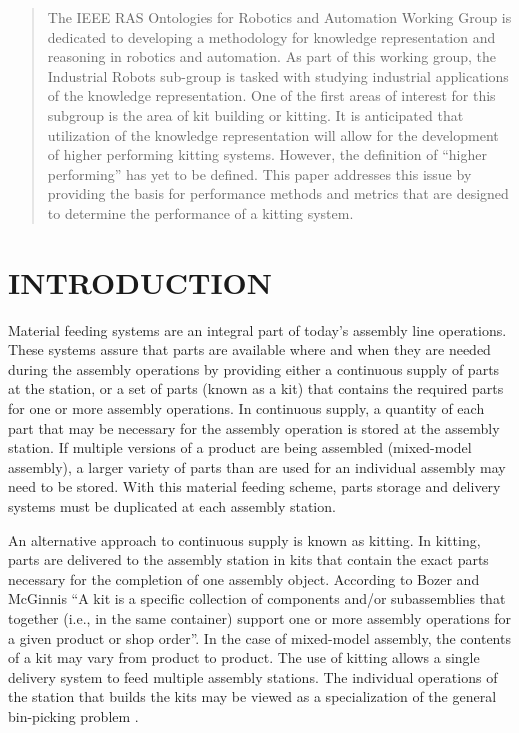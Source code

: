 



%
\maketitle
\thispagestyle{empty}
\pagestyle{plain}

\begin{abstract}

The IEEE RAS Ontologies for Robotics and Automation Working Group is dedicated to
developing a methodology for knowledge representation and reasoning in robotics
and automation. As part of this working group, the Industrial Robots sub-group is
tasked with studying industrial applications of the knowledge representation. One of the first
areas of interest for this subgroup is the area of kit building or kitting.
It is anticipated that utilization of the knowledge representation will allow for the development
of higher performing kitting systems. However, the definition of ``higher performing''
has yet to be defined. This paper addresses this issue by providing the basis
for performance methods and metrics that are designed to
determine the performance of a kitting system.
\end{abstract}


\section{INTRODUCTION}
Material feeding systems are an integral part of today's assembly line operations.
These systems assure that parts are available where and when
they are needed during the assembly operations by providing either a continuous
supply of parts at the station, or a set of parts (known
as a kit) that contains the required parts for one or more assembly operations.
In continuous supply, a quantity of each part that
may be necessary for the assembly operation is stored at the assembly station.
If multiple versions of a product are being assembled (mixed-model assembly),
a larger variety of parts than are used for an individual assembly may need
to be stored. With this material feeding scheme, parts
storage and delivery systems must be duplicated at each assembly station.

An alternative approach to continuous supply is known as kitting. In kitting,
parts are delivered to the assembly station in kits that contain
the exact parts necessary for the completion of one assembly object.
According to Bozer and McGinnis \cite{Bozer1992} ``A kit is a specific
collection of components and/or subassemblies that together
(i.e., in the same container) support one or more assembly
operations for a given product or shop order''. In the case of mixed-model
assembly, the contents of a kit may vary from product to product.
The use of kitting allows a single delivery system to feed
multiple assembly stations. The individual operations of the station that
builds the kits may be viewed as a specialization of the general
bin-picking problem \cite{Schyja2012}.


